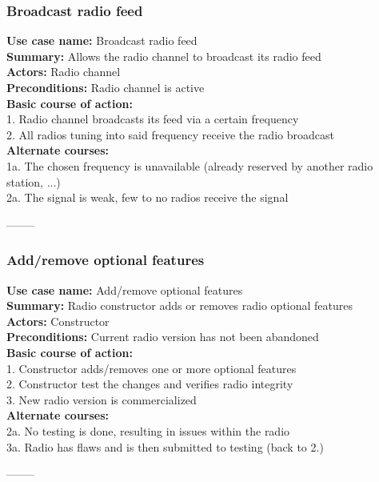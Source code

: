 \documentclass[11pt]{article}
\begin{document}
\subsubsection{Broadcast radio feed}
\textbf{Use case name:} Broadcast radio feed\\
\textbf{Summary:} Allows the radio channel to broadcast its radio feed\\
\textbf{Actors:} Radio channel\\
\textbf{Preconditions:} Radio channel is active\\
\textbf{Basic course of action:}\\
\hspace*{10mm}1. Radio channel broadcasts its feed via a certain frequency\\
\hspace*{10mm}2. All radios tuning into said frequency receive the radio broadcast\\
\textbf{Alternate courses:}\\
\hspace*{10mm}1a. The chosen frequency is unavailable (already reserved by another radio station, ...)\\
\hspace*{10mm}2a. The signal is weak, few to no radios receive the signal
\begin{center}--------\end{center}

\subsubsection{Add/remove optional features}
\textbf{Use case name:} Add/remove optional features\\
\textbf{Summary:} Radio constructor adds or removes radio optional features\\
\textbf{Actors:} Constructor\\
\textbf{Preconditions:} Current radio version has not been abandoned\\
\textbf{Basic course of action:}\\
\hspace*{10mm}1. Constructor adds/removes one or more optional features\\
\hspace*{10mm}2. Constructor test the changes and verifies radio integrity\\
\hspace*{10mm}3. New radio version is commercialized\\
\textbf{Alternate courses:}\\
\hspace*{10mm}2a. No testing is done, resulting in issues within the radio\\
\hspace*{10mm}3a. Radio has flaws and is then submitted to testing (back to 2.)
\begin{center}--------\end{center}
\end{document}
